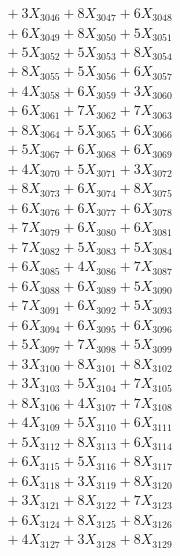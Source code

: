 \documentclass[a4paper,10pt]{article}
\begin{document}
{\begin{align}
&\;  + 3 X_{3046} + 8 X_{3047} + 6 X_{3048} \\[0.3ex]
&\;  + 6 X_{3049} + 8 X_{3050} + 5 X_{3051} \\[0.3ex]
&\;  + 5 X_{3052} + 5 X_{3053} + 8 X_{3054} \\[0.3ex]
&\;  + 8 X_{3055} + 5 X_{3056} + 6 X_{3057} \\[0.3ex]
&\;  + 4 X_{3058} + 6 X_{3059} + 3 X_{3060} \\[0.3ex]
&\;  + 6 X_{3061} + 7 X_{3062} + 7 X_{3063} \\[0.3ex]
&\;  + 8 X_{3064} + 5 X_{3065} + 6 X_{3066} \\[0.3ex]
&\;  + 5 X_{3067} + 6 X_{3068} + 6 X_{3069} \\[0.5ex]\allowbreak
&\;  + 4 X_{3070} + 5 X_{3071} + 3 X_{3072} \\[0.3ex]
&\;  + 8 X_{3073} + 6 X_{3074} + 8 X_{3075} \\[0.3ex]
&\;  + 6 X_{3076} + 6 X_{3077} + 6 X_{3078} \\[0.3ex]
&\;  + 7 X_{3079} + 6 X_{3080} + 6 X_{3081} \\[0.3ex]
&\;  + 7 X_{3082} + 5 X_{3083} + 5 X_{3084} \\[0.3ex]
&\;  + 6 X_{3085} + 4 X_{3086} + 7 X_{3087} \\[0.3ex]
&\;  + 6 X_{3088} + 6 X_{3089} + 5 X_{3090} \\[0.3ex]
&\;  + 7 X_{3091} + 6 X_{3092} + 5 X_{3093} \\[0.3ex]
&\;  + 6 X_{3094} + 6 X_{3095} + 6 X_{3096} \\[0.3ex]
&\;  + 5 X_{3097} + 7 X_{3098} + 5 X_{3099} \\[0.5ex]\allowbreak
&\;  + 3 X_{3100} + 8 X_{3101} + 8 X_{3102} \\[0.3ex]
&\;  + 3 X_{3103} + 5 X_{3104} + 7 X_{3105} \\[0.3ex]
&\;  + 8 X_{3106} + 4 X_{3107} + 7 X_{3108} \\[0.3ex]
&\;  + 4 X_{3109} + 5 X_{3110} + 6 X_{3111} \\[0.3ex]
&\;  + 5 X_{3112} + 8 X_{3113} + 6 X_{3114} \\[0.3ex]
&\;  + 6 X_{3115} + 5 X_{3116} + 8 X_{3117} \\[0.3ex]
&\;  + 6 X_{3118} + 3 X_{3119} + 8 X_{3120} \\[0.3ex]
&\;  + 3 X_{3121} + 8 X_{3122} + 7 X_{3123} \\[0.3ex]
&\;  + 6 X_{3124} + 8 X_{3125} + 8 X_{3126} \\[0.3ex]
&\;  + 4 X_{3127} + 3 X_{3128} + 8 X_{3129} \\[0.5ex]\allowbreak

\end{align}}
\end{document}
